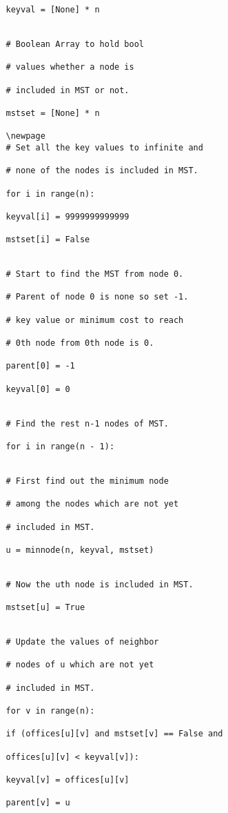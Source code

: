 \documentclass[12pt]{article}
\begin{document}
\begin{enumerate}
{\begin{enumerate}
\begin{verbatim}
	        	keyval = [None] * n  

	        	
	        	# Boolean Array to hold bool  

	        	# values whether a node is 

	        	# included in MST or not.  

	        	mstset = [None] * n 

	        	\newpage
	        	# Set all the key values to infinite and  

	        	# none of the nodes is included in MST. 

	        	for i in range(n): 

	        	keyval[i] = 9999999999999

	        	mstset[i] = False

	        	
	        	# Start to find the MST from node 0.  

	        	# Parent of node 0 is none so set -1.  

	        	# key value or minimum cost to reach  

	        	# 0th node from 0th node is 0.  

	        	parent[0] = -1

	        	keyval[0] = 0

	        	
	        	# Find the rest n-1 nodes of MST. 

	        	for i in range(n - 1): 

	        	
	        	# First find out the minimum node  

	        	# among the nodes which are not yet  

	        	# included in MST.  

	        	u = minnode(n, keyval, mstset)  

	        	
	        	# Now the uth node is included in MST.  

	        	mstset[u] = True

	        	
	        	# Update the values of neighbor  

	        	# nodes of u which are not yet  

	        	# included in MST.  

	        	for v in range(n): 

	        	if (offices[u][v] and mstset[v] == False and 

	        	offices[u][v] < keyval[v]):  

	        	keyval[v] = offices[u][v]  

	        	parent[v] = u 


\end{verbatim}
\end{enumerate}}
\end{enumerate}
\end{document}
